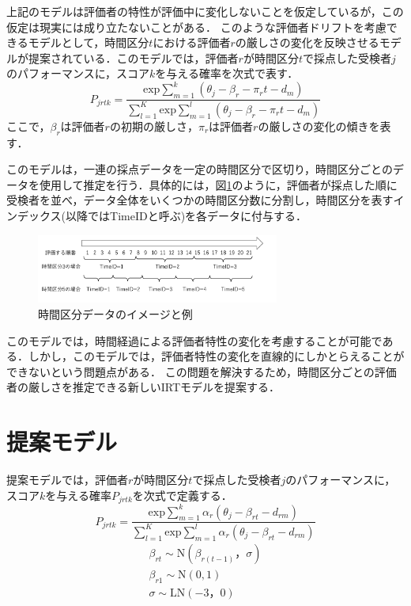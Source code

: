 \documentclass[dvipdfmx, twocolumn, a4paper]{hcresume}
\begin{document}
上記のモデルは評価者の特性が評価中に変化しないことを仮定しているが，この仮定は現実には成り立たないことがある．
このような評価者ドリフトを考慮できるモデルとして，時間区分$t$における評価者$r$の厳しさの変化を反映させるモデルが提案されている\cite{Raudenbush}．このモデルでは，評価者$r$が時間区分$t$で採点した受検者$j$のパフォーマンスに，スコア$k$を与える確率を次式で表す．
\begin{equation}
  P_{jrtk}=\frac{\mathrm{exp}\sum_{m=1}^{k}(\theta_{j}-\beta_{r} - \pi_{r}t-d_{m})}{\sum_{l=1}^{K}\mathrm{exp}\sum_{m=1}^{l}(\theta_{j}-\beta_{r} - \pi_{r}t-d_{m})}
\end{equation}
ここで，$\beta_{r}$は評価者$r$の初期の厳しさ，$\pi_{r}$は評価者$r$の厳しさの変化の傾きを表す．

このモデルは，一連の採点データを一定の時間区分で区切り，時間区分ごとのデータを使用して推定を行う．具体的には，図\ref{timeid}のように，評価者が採点した順に受検者を並べ，データ全体をいくつかの時間区分数に分割し，時間区分を表すインデックス(以降ではTimeIDと呼ぶ)を各データに付与する．

\begin{figure}[t]
  \centering
  \includegraphics[width=8cm]{img/timeid.png}
  \caption{時間区分データのイメージと例}
  \label{timeid}
\end{figure}

このモデルでは，時間経過による評価者特性の変化を考慮することが可能である．しかし，このモデルでは，評価者特性の変化を直線的にしかとらえることができないという問題点がある．
この問題を解決するため，時間区分ごとの評価者の厳しさを推定できる新しいIRTモデルを提案する．
\section{提案モデル}
提案モデルでは，評価者$r$が時間区分$t$で採点した受検者$j$のパフォーマンスに，スコア$k$を与える確率$P_{jrtk}$を次式で定義する．
\begin{equation}
  P_{jrtk}=\frac{\mathrm{exp}\sum^k_{m=1}{\alpha_r(\theta_{j}-\beta_{rt}-d_{rm})}}{\sum^K_{l=1} \mathrm{exp}\sum^l_{m=1}{\alpha_r(\theta_{j}-\beta_{rt}-d_{rm})}}
\end{equation}
\begin{eqnarray}
  \beta_{rt}\sim \mathrm{N}(\beta_{r(t-1)}，\sigma)\nonumber\\
  \beta_{r1} \sim \mathrm{N}(0,1)\nonumber\\
  \sigma \sim \mathrm{LN}(-3，0)\nonumber
\end{eqnarray}
\end{document}
